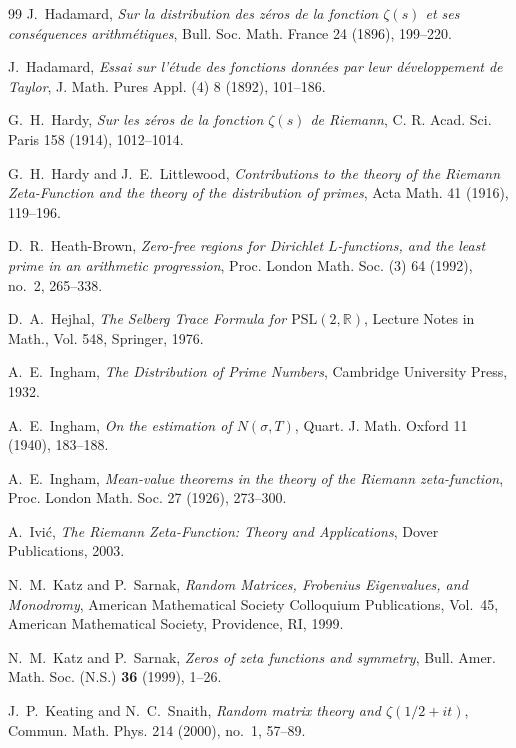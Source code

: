 \documentclass{article}
\begin{document}
\begin{thebibliography}{99}
J.~Hadamard, 
\emph{Sur la distribution des zéros de la fonction $\zeta(s)$ et ses conséquences arithmétiques}, 
Bull. Soc. Math. France 24 (1896), 199--220.

J.~Hadamard, 
\emph{Essai sur l'étude des fonctions données par leur développement de Taylor}, 
J. Math. Pures Appl. (4) 8 (1892), 101--186.

G.~H.~Hardy, 
\emph{Sur les zéros de la fonction $\zeta(s)$ de Riemann}, 
C. R. Acad. Sci. Paris 158 (1914), 1012--1014.

G.~H.~Hardy and J.~E.~Littlewood, 
\emph{Contributions to the theory of the Riemann Zeta-Function and the theory of the distribution of primes}, 
Acta Math. 41 (1916), 119--196.

D.~R.~Heath-Brown, 
\emph{Zero-free regions for Dirichlet $L$-functions, and the least prime in an arithmetic progression}, 
Proc. London Math. Soc. (3) 64 (1992), no.~2, 265--338.

D.~A.~Hejhal, 
\emph{The Selberg Trace Formula for $\mathrm{PSL}(2,\mathbb{R})$}, 
Lecture Notes in Math., Vol. 548, Springer, 1976.

A.~E.~Ingham, 
\emph{The Distribution of Prime Numbers}, 
Cambridge University Press, 1932.

A.~E.~Ingham, 
\emph{On the estimation of $N(\sigma, T)$}, Quart. J. Math. Oxford 11 (1940), 183--188.

A.~E.~Ingham, \emph{Mean-value theorems in the theory of the Riemann zeta-function}, Proc. London Math. Soc. 27 (1926), 273--300. 

A.~Ivić, 
\emph{The Riemann Zeta-Function: Theory and Applications}, 
Dover Publications, 2003.

N.~M.~Katz and P.~Sarnak, 
\emph{Random Matrices, Frobenius Eigenvalues, and Monodromy}, 
American Mathematical Society Colloquium Publications, Vol.~45, 
American Mathematical Society, Providence, RI, 1999.

N.~M.~Katz and P.~Sarnak, 
\emph{Zeros of zeta functions and symmetry}, 
Bull. Amer. Math. Soc. (N.S.) \textbf{36} (1999), 1--26. 

J.~P.~Keating and N.~C.~Snaith, 
\emph{Random matrix theory and $\zeta(1/2 + it)$}, 
Commun. Math. Phys. 214 (2000), no.~1, 57--89.


\end{thebibliography}
\end{document}
